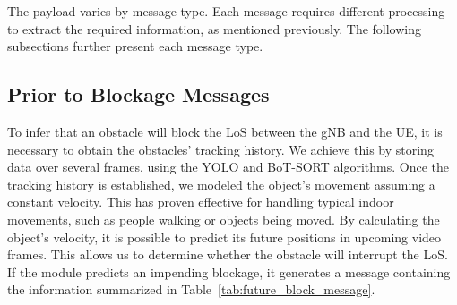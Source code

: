 \begin{table}[H]
    \caption{Components of each message header.}
    \label{tab:header}
    \centering
\end{table}

The payload varies by message type.
Each message requires different processing to extract the required information, as mentioned previously.
The following subsections further present each message type.

\subsection{Prior to Blockage Messages}\label{subsec:prediction-of-blockage-messages}

To infer that an obstacle will block the LoS between the gNB and the UE, it is necessary to obtain the obstacles' tracking history.
We achieve this by storing data over several frames, using the YOLO and BoT-SORT algorithms.
Once the tracking history is established, we modeled the object's movement assuming a constant velocity.
This has proven effective for handling typical indoor movements, such as people walking or objects being moved.
By calculating the object's velocity, it is possible to predict its future positions in upcoming video frames.
This allows us to determine whether the obstacle will interrupt the LoS\@.
If the module predicts an impending blockage, it generates a message containing the information summarized in Table~\ref{tab:future_block_message}.


